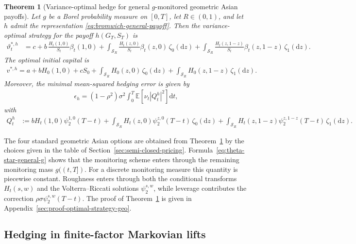 \documentclass[10pt,a4paper,reqno]{amsart}
\theoremstyle{plain}
\newtheorem{theorem}{Theorem}[section]
\theoremstyle{definition}
\theoremstyle{remark}
\theoremstyle{example}
\begin{document}
\begin{theorem}[Variance-optimal hedge for general $g$-monitored geometric Asian payoffs]
\label{thm:optimal-strategy-geo}
Let $g$ be a Borel probability measure on $[0,T]$, let $R\in(0,1)$, and let $h$ admit the representation \eqref{eq:bromwich-general-payoff}. Then the variance-optimal strategy for the payoff $h(G_T,S_T)$ is
\begin{align}
    \vartheta_t^{*,h} &= c + b\, \frac{H_t(1,0)}{S_t} \beta_t(1,0) + \int_{\mathcal S_R} \frac{H_t(z,0)}{S_t} \beta_t(z,0)\, \zeta_0(\mathrm dz) + \int_{\mathcal S_R} \frac{H_t(z,1-z)}{S_t} \beta_t(z,1-z)\, \zeta_1(\mathrm dz). \label{eq:theta-star-general-g}
\end{align}
The optimal initial capital is
\begin{align}\label{eq:optimal-capital-general-g}
    v^{*,h} = a + bH_0(1,0) + cS_0 + \int_{\mathcal S_R} H_0(z,0)\, \zeta_0(\mathrm dz) + \int_{\mathcal S_R} H_0(z,1-z)\, \zeta_1(\mathrm dz).
\end{align}
Moreover, the minimal mean-squared hedging error is given by
\begin{align}\label{eq:hedging-error-general}
    \epsilon_h = (1-\rho^2)\sigma^2 \int_0^T \mathbb E\left[ \nu_t |Q_t^h|^2 \right] \mathrm dt,
\end{align}
with 
\begin{align}\label{eq:Qh-general-g}
    Q_t^h &:= bH_t(1,0)\psi_2^{1,0}(T-t) + \int_{\mathcal S_R} H_t(z,0) \psi_2^{z,0}(T-t)\, \zeta_0(\mathrm dz) + \int_{\mathcal S_R} H_t(z,1-z) \psi_2^{z,1-z}(T-t)\, \zeta_1(\mathrm dz).
\end{align}
\end{theorem}

The four standard geometric Asian options are obtained from Theorem~\ref{thm:optimal-strategy-geo} by the choices given in the table of Section~\ref{sec:semi-closed-pricing}. Formula~\eqref{eq:theta-star-general-g} shows that the monitoring scheme enters through the remaining monitoring mass $g((t,T])$. For a discrete monitoring measure this quantity is piecewise constant. Roughness enters through both the conditional transforms $H_t(s,w)$ and the Volterra--Riccati solutions $\psi_2^{s,w}$, while leverage contributes the correction $\rho\sigma\psi_2^{s,w}(T-t)$.
The proof of Theorem~\ref{thm:optimal-strategy-geo} is given in Appendix~\ref{sec:proof-optimal-strategy-geo}.


\subsection{Hedging in finite-factor Markovian lifts}
\label{subsec:markapprox}
\end{document}
